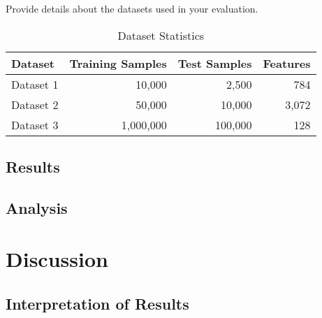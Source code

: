 \documentclass[11pt,a4paper]{article}
\begin{document}
Provide details about the datasets used in your evaluation.

\begin{table}[htbp]
\centering
\caption{Dataset Statistics}
\label{tab:datasets}
\begin{tabular}{@{}lrrr@{}}
\toprule
Dataset & Training Samples & Test Samples & Features \\
\midrule
Dataset 1 & 10,000 & 2,500 & 784 \\
Dataset 2 & 50,000 & 10,000 & 3,072 \\
Dataset 3 & 1,000,000 & 100,000 & 128 \\
\bottomrule
\end{tabular}
\end{table}

\subsection{Results}
\label{subsec:results}


\subsection{Analysis}
\label{subsec:analysis}


\section{Discussion}
\label{sec:discussion}


\subsection{Interpretation of Results}
\label{subsec:interpretation}

\end{document}

